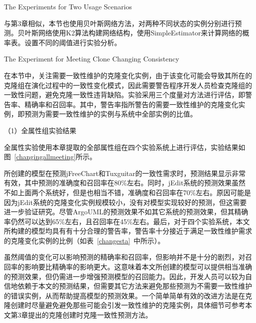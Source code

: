{The Experiments for Two Usage Scenarios}

与第3章相似，本节也使用贝叶斯网络方法，对两种不同状态的实例分别进行预测。贝叶斯网络使用K2算法构建网络结构，使用SimpleEstimator来计算网络的概率表。设置不同的阈值进行实验分析。

{The Experiment for Meeting Clone Changing Consistency}

在本节中，关注需要一致性维护的克隆变化实例，由于该变化可能会导致其所在的克隆组在演化过程中的一致性变化模式，因此需要警告程序开发人员检查克隆组的一致性问题，避免克隆一致性违背缺陷。实验采用三个度量对方法进行评估，即警告率、精确率和召回率。其中，警告率指所警告的需要一致性维护的克隆变化实例，即预测为需要一致性维护的实例与系统中全部实例的比值。


（1）全属性组实验结果

全属性实验使用本章提取的全部属性组在四个实验系统上进行评估，实验结果如图~\ref{changingallmeeting}所示。

所创建的模型在预测jFreeChart和Tuxguitar的一致性需求时，预测结果显示非常有效，其中预测的准确度和召回率在80\%左右。同时，jEdit系统的预测效果虽然不如上面两个系统好，但是也相当不错，准确度和召回率在70\%左右。原因可能是因为jEdit系统的克隆变化实例规模较小，没有对模型实现较好的预测，但这需要进一步验证研究。尽管ArgoUML的预测效果不如其它系统的预测效果，但其精确率仍然可以达到65\%左右，且召回率在45\%左右。最后，对于四个实验系统，本文所构建的模型均具有有十分合理的警告率，警告率十分接近于满足一致性维护需求的克隆变化实例的比例（如表~\ref {changesta}~中所示）。

虽然阈值的变化可以影响预测的精确率和召回率，但影响并不是十分的剧烈，对召回率的影响要比精确率的影响更大。这意味着本文所创建的模型可以提供相当准确的预测效果，但仍需进一步增强预测模型的召回能力。因此，开发人员可以较为自信地依赖于本文的预测结果，但需要其它方法来避免那些预测为不需要一致性维护的错误实例，从而帮助提高模型的预测效果。一个简单简单有效的改进方法是在克隆创建时尽量避免避免那些可能会引发一致性维护的克隆实例，具体细节可参考本文第3章提出的克隆创建时克隆一致性预测方法。

